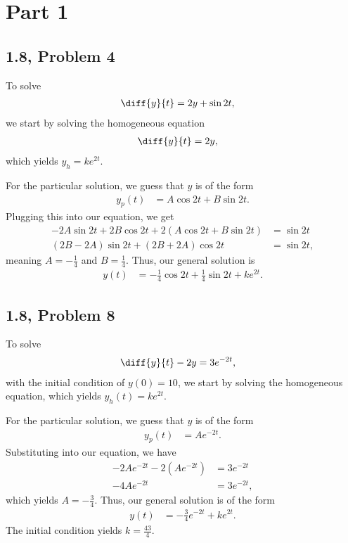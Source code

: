 \documentclass[10pt]{mypackage}
\begin{document}
\RaggedRight
\section{Part 1}%
\subsection{1.8, Problem 4}%
To solve
\begin{align*}
  \diff{y}{t} &= 2y + \sin 2t,
\end{align*}
we start by solving the homogeneous equation
\begin{align*}
  \diff{y}{t} &= 2y,
\end{align*}
which yields $y_{h} = ke^{2t}$.\newline

For the particular solution, we guess that $y$ is of the form
\begin{align*}
  y_p(t) &= A\cos 2t + B\sin 2t.
\end{align*}
Plugging this into our equation, we get
\begin{align*}
  -2A\sin 2t + 2B\cos 2t + 2\left(A\cos 2t + B\sin 2t\right) &= \sin 2t\\
  \left(2B - 2A\right) \sin 2t + \left(2B + 2A\right)\cos 2t &= \sin 2t,
\end{align*}
meaning $A = -\frac{1}{4}$ and $B = \frac{1}{4}$. Thus, our general solution is
\begin{align*}
  y(t) &= -\frac{1}{4}\cos 2t + \frac{1}{4}\sin 2t + ke^{2t}.
\end{align*}
\subsection{1.8, Problem 8}%
To solve
\begin{align*}
  \diff{y}{t}-2y &= 3e^{-2t},
\end{align*}
with the initial condition of $y(0) = 10$, we start by solving the homogeneous equation, which yields $y_h(t) = ke^{2t}$.\newline

For the particular solution, we guess that $y$ is of the form
\begin{align*}
  y_p(t) &= Ae^{-2t}.
\end{align*}
Substituting into our equation, we have
\begin{align*}
  -2Ae^{-2t} - 2\left(Ae^{-2t}\right) &= 3e^{-2t}\\
  -4Ae^{-2t} &= 3e^{-2t},
\end{align*}
which yields $A = -\frac{3}{4}$. Thus, our general solution is of the form
\begin{align*}
  y(t) &= -\frac{3}{4}e^{-2t} + ke^{2t}.
\end{align*}
The initial condition yields $k = \frac{43}{4}$.
\end{document}
